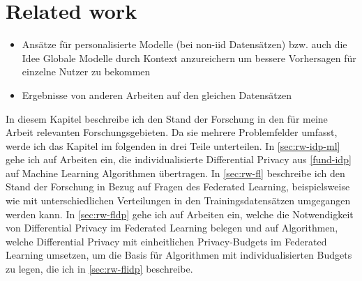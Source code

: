 \chapter{Related work}\label{chap:related-work}

\begin{itemize}
	\item Ansätze für personalisierte Modelle (bei non-iid Datensätzen) \parencite[p.28ff]{kairouz:2021} bzw. auch die Idee Globale Modelle durch Kontext anzureichern um bessere Vorhersagen für einzelne Nutzer zu bekommen
	\item Ergebnisse von anderen Arbeiten auf den gleichen Datensätzen
\end{itemize}

In diesem Kapitel beschreibe ich den Stand der Forschung in den für meine Arbeit relevanten Forschungsgebieten. Da sie mehrere Problemfelder umfasst, werde ich das Kapitel im folgenden in drei Teile unterteilen. In \autoref{sec:rw-idp-ml} gehe ich auf Arbeiten ein, die individualisierte Differential Privacy aus \autoref{fund-idp} auf Machine Learning Algorithmen übertragen. In \autoref{sec:rw-fl} beschreibe ich den Stand der Forschung in Bezug auf Fragen des Federated Learning, beispielsweise wie mit unterschiedlichen Verteilungen in den Trainingsdatensätzen umgegangen werden kann. In \autoref{sec:rw-fldp} gehe ich auf Arbeiten ein, welche die Notwendigkeit von Differential Privacy im Federated Learning belegen und auf Algorithmen, welche Differential Privacy mit einheitlichen Privacy-Budgets im Federated Learning umsetzen, um die Basis für Algorithmen mit individualisierten Budgets zu legen, die ich in \autoref{sec:rw-flidp} beschreibe.

